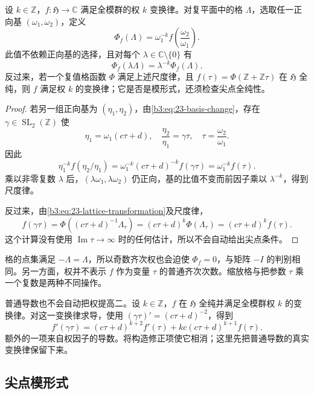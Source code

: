 \begin{proposition}[权与格的尺度]\label{b3:prop:23-lattice-weight}
设 \(k\in\mathbb Z\)，\(f:\mathfrak H\to\mathbb C\) 满足全模群的权 \(k\) 变换律。对复平面中的格 \(\Lambda\)，选取任一正向基 \((\omega_1,\omega_2)\)，定义
\[
 \Phi_f(\Lambda)=\omega_1^{-k}
          f\!\left(\frac{\omega_2}{\omega_1}\right).
\]
此值不依赖正向基的选择，且对每个 \(\lambda\in\mathbb C\setminus\{0\}\) 有
\[
 \Phi_f(\lambda\Lambda)=\lambda^{-k}\Phi_f(\Lambda).
\]
反过来，若一个复值格函数 \(\Phi\) 满足上述尺度律，且 \(f(\tau)=\Phi(\mathbb Z+\mathbb Z\tau)\) 在 \(\mathfrak H\) 全纯，则 \(f\) 满足权 \(k\) 的变换律；它是否是模形式，还须检查尖点全纯性。
\end{proposition}
\begin{proof}
若另一组正向基为 \((\eta_1,\eta_2)\)，由\eqref{b3:eq:23-basis-change}，存在 \(\gamma\in\operatorname{SL}_2(\mathbb Z)\) 使
\[
 \eta_1=\omega_1(c\tau+d),\quad
 \frac{\eta_2}{\eta_1}=\gamma\tau,
 \quad \tau=\frac{\omega_2}{\omega_1}.
\]
因此
\[
 \eta_1^{-k}f(\eta_2/\eta_1)
 =\omega_1^{-k}(c\tau+d)^{-k}f(\gamma\tau)
 =\omega_1^{-k}f(\tau).
\]
乘以非零复数 \(\lambda\) 后，\((\lambda\omega_1,\lambda\omega_2)\) 仍正向，基的比值不变而前因子乘以 \(\lambda^{-k}\)，得到尺度律。

反过来，由\eqref{b3:eq:23-lattice-transformation}及尺度律，
\[
 f(\gamma\tau)
 =\Phi((c\tau+d)^{-1}\Lambda_\tau)
 =(c\tau+d)^k\Phi(\Lambda_\tau)
 =(c\tau+d)^kf(\tau).
\]
这个计算没有使用 \(\operatorname{Im}\tau\to\infty\) 时的任何估计，所以不会自动给出尖点条件。
\end{proof}

格的点集满足 \(-\Lambda=\Lambda\)，所以奇数齐次权也会迫使 \(\Phi_f=0\)，与矩阵 \(-I\) 的判别相同。另一方面，权并不表示 \(f\) 作为变量 \(\tau\) 的普通齐次次数。缩放格与把参数 \(\tau\) 乘一个复数是两种不同操作。

普通导数也不会自动把权提高二。设 \(k\in\mathbb Z\)，\(f\) 在 \(\mathfrak H\) 全纯并满足全模群权 \(k\) 的变换律。对这一变换律求导，使用 \((\gamma\tau)'=(c\tau+d)^{-2}\)，得到
\begin{equation}\label{b3:eq:23-ordinary-derivative-law}
 f'(\gamma\tau)
 =(c\tau+d)^{k+2}f'(\tau)
   +kc(c\tau+d)^{k+1}f(\tau).
\end{equation}
额外的一项来自权因子的导数。将构造修正项使它相消；这里先把普通导数的真实变换律保留下来。

\subsection{尖点模形式}
\label{b3:subsec:230303}

